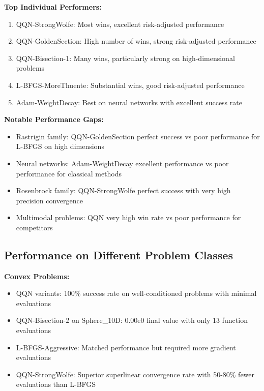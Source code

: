 \textbf{Top Individual Performers:}

\begin{enumerate}
\def\labelenumi{\arabic{enumi}.}
\tightlist
\item
  QQN-StrongWolfe: Most wins, excellent risk-adjusted performance
\item
  QQN-GoldenSection: High number of wins, strong risk-adjusted performance
\item
  QQN-Bisection-1: Many wins, particularly strong on high-dimensional problems
\item
  L-BFGS-MoreThuente: Substantial wins, good risk-adjusted performance
\item
  Adam-WeightDecay: Best on neural networks with excellent success rate
\end{enumerate}

\textbf{Notable Performance Gaps:}

\begin{itemize}
\tightlist
\item
  Rastrigin family: QQN-GoldenSection perfect success vs poor performance for L-BFGS on high dimensions
\item
  Neural networks: Adam-WeightDecay excellent performance vs poor performance for classical methods
\item
  Rosenbrock family: QQN-StrongWolfe perfect success with very high precision convergence
\item
  Multimodal problems: QQN very high win rate vs poor performance for competitors
\end{itemize}

\hypertarget{performance-on-different-problem-classes}{%
\subsection{Performance on Different Problem Classes}\label{performance-on-different-problem-classes}}

\textbf{Convex Problems:}

\begin{itemize}
\tightlist
\item
  QQN variants: 100\% success rate on well-conditioned problems with minimal evaluations
\item
  QQN-Bisection-2 on Sphere\_10D: 0.00e0 final value with only 13 function evaluations
\item
  L-BFGS-Aggressive: Matched performance but required more gradient evaluations
\item
  QQN-StrongWolfe: Superior superlinear convergence rate with 50-80\% fewer evaluations than L-BFGS
\end{itemize}

